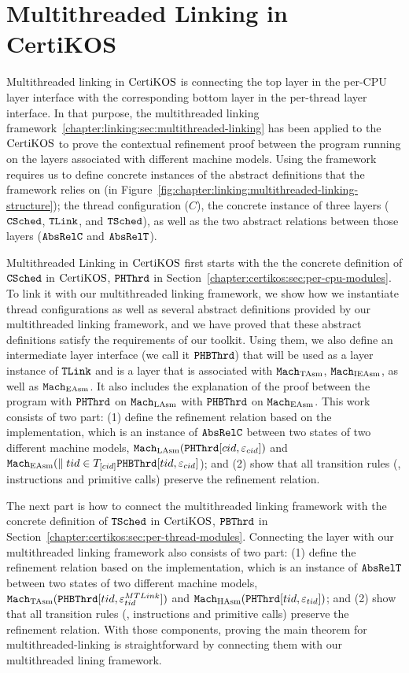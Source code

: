 \section{Multithreaded Linking in CertiKOS}
\label{chapter:certikos:sec:multithreaded-linking-for-certikos}


Multithreaded linking in $\mathrm{CertiKOS}$ is connecting the top layer in the per-CPU layer interface with
the corresponding bottom layer in the per-thread layer interface. 
In that purpose, the multithreaded linking framework~\ref{chapter:linking:sec:multithreaded-linking} 
has been applied to the $\mathrm{CertiKOS}$ to prove the contextual refinement proof between the program running on the layers associated with different machine models.
Using the framework requires us to define concrete instances 
of the abstract definitions that the framework relies on (in Figure~\ref{fig:chapter:linking:multithreaded-linking-structure});
the thread configuration ($C$), the concrete instance of three layers (${{\mathrm{\texttt{CSched}}}}$, ${{\mathrm{\texttt{TLink}}}}$, and ${{\mathrm{\texttt{TSched}}}}$), 
as well as the two abstract relations between those layers (${{\mathrm{\texttt{AbsRelC}}}}$ and ${{\mathrm{\texttt{AbsRelT}}}}$). 

Multithreaded Linking in $\mathrm{CertiKOS}$ first starts with the the concrete definition of ${{\mathrm{\texttt{CSched}}}}$ in $\mathrm{CertiKOS}$, ${{\mathrm{\texttt{PHThrd}}}}$ in Section~\ref{chapter:certikos:sec:per-cpu-modules}.
To link it with our multithreaded linking framework,
we show how we instantiate thread configurations as well as several abstract definitions provided by our multithreaded linking framework, and we have proved that these abstract definitions satisfy the requirements of our toolkit.
Using them, we also define an intermediate layer interface (we call it ${{\mathrm{\texttt{PHBThrd}}}}$) that will be used as a layer instance of ${{\mathrm{\texttt{TLink}}}}$ and is a layer that is associated with ${\mathrm{\texttt{Mach}}}_{\mathrm{TAsm}}$, ${\mathrm{\texttt{Mach}}}_{\mathrm{IEAsm}}$, as well as ${\mathrm{\texttt{Mach}}}_{\mathrm{EAsm}}$.
It also includes  the explanation of the proof between the program with  ${{\mathrm{\texttt{PHThrd}}}}$ on ${\mathrm{\texttt{Mach}}}_{\mathrm{LAsm}}$ 
with ${{\mathrm{\texttt{PHBThrd}}}}$ on ${\mathrm{\texttt{Mach}}}_{\mathrm{EAsm}}$. 
This work consists of two part:  (1) define the refinement relation based on the implementation, which is an instance of ${{\mathrm{\texttt{AbsRelC}}}}$ between two states of two different machine models,
${\mathrm{\texttt{Mach}}}_{\mathrm{LAsm}}({{\mathrm{\texttt{PHThrd}}}}[cid, {\varepsilon}_{cid}])$ and 
${\mathrm{\texttt{Mach}}}_{\mathrm{EAsm}}(\parallel tid \in T_{[cid]} {{\mathrm{\texttt{PHBThrd}}}}[tid, {\varepsilon}_{cid}]$); and 
(2) show that all transition rules (\ie, instructions and primitive calls) preserve the refinement relation. 

The next part is how to connect the multithreaded linking framework with the concrete definition of  ${{\mathrm{\texttt{TSched}}}}$ in $\mathrm{CertiKOS}$, ${{\mathrm{\texttt{PBThrd}}}}$ in Section~\ref{chapter:certikos:sec:per-thread-modules}.
Connecting the layer with our multithreaded linking framework also consists of two part:  (1) define the refinement relation based on the implementation, which is an instance of ${{\mathrm{\texttt{AbsRelT}}}}$ between two states of two different machine models,
${\mathrm{\texttt{Mach}}}_{\mathrm{TAsm}}({{\mathrm{\texttt{PHBThrd}}}}[tid, {\varepsilon}^{MTLink}_{tid}])$ and 
${\mathrm{\texttt{Mach}}}_{\mathrm{HAsm}}({{\mathrm{\texttt{PHThrd}}}}[tid, {\varepsilon}_{tid}])$; and 
(2) show that all transition rules (\ie, instructions and primitive calls) preserve the refinement relation. 
With those components, proving the main theorem for multithreaded-linking is straightforward by connecting 
them with our multithreaded lining framework.


